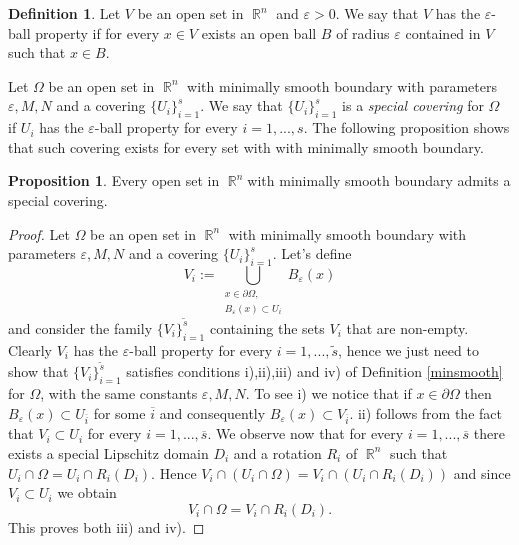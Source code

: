 \documentclass[12pt]{article}
\theoremstyle{definition}
\newtheorem{definition}{Definition}
\newtheorem{prop}{Proposition}
\DeclareMathOperator\rr{\mathbb{R}}
\begin{document}
\begin{definition}
Let $V$ be an open set in $\rr^n$ and $\varepsilon >0$. We say that $V$  has the $\varepsilon$-ball property if for every $ x\in V $ exists an open ball $B$ of radius $\varepsilon$ contained in $V$ such that $x \in B.$
\end{definition}
 Let $\Omega$ be an open set in $\rr^n$ with minimally smooth boundary with parameters $\varepsilon,M,N$ and a covering $\{ U_i\}_{i=1}^s.$ We say that $\{ U_i\}_{i=1}^s$ is a \textit{special covering} for $\Omega$ if $U_i$ has the $\varepsilon$-ball property for every $i=1,...,s.$ The following proposition shows that such covering exists for every set with with minimally smooth boundary.
 \begin{prop}
 Every open set in $\rr^n $with minimally smooth boundary admits a special covering.
 \end{prop}
 \begin{proof}
 Let $\Omega$ be an open set in $\rr^n$ with minimally smooth boundary with parameters $\varepsilon,M,N$ and a covering $\{ U_i\}_{i=1}^s.$ Let's define
\[V_i:=\bigcup_{\substack{x \in \partial\Omega, \\ B_\varepsilon(x) \subset U_i}}B_\varepsilon(x) \]
and consider the family $\{ V_i\}_{i=1}^{\widetilde s}$ containing the sets $V_i$ that are non-empty. Clearly $V_i$ has the $\varepsilon$-ball property for every $i=1,...,\widetilde s$, hence we just need to show that $\{ V_i\}_{i=1}^{\widetilde s}$ satisfies conditions i),ii),iii) and iv) of Definition \ref{minsmooth} for $\Omega$, with the same constants $\varepsilon,M,N$. To see i) we notice that if $x \in \partial \Omega$ then $B_\varepsilon(x) \subset U_{\overline i}$ for some $\overline i$ and consequently $B_\varepsilon(x) \subset V_{\overline i}.$ ii) follows from the fact that $V_i \subset U_i$ for every $i=1,...,\overline s$. We observe now that for every $i=1,...,\overline s$ there exists a special Lipschitz domain $D_i$ and a rotation $R_i$ of $\rr^n$ such that $U_i\cap \Omega=U_i \cap R_i(D_i).$ Hence $ V_i \cap ( U_i\cap \Omega)=V_i\cap (U_i \cap R_i(D_i))$ and since $V_i \subset U_i$ we obtain
\[ V_i \cap  \Omega=V_i\cap  R_i(D_i).\] This proves both iii) and iv).
\end{proof}
\end{document}
